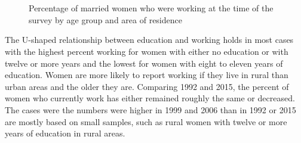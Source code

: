 \documentclass[12pt,letterpaper]{article}
\begin{document}
\begin{figure}[!htpb]
\centering
{}
\\
\\
\caption{Percentage of married women who were working at the time of the 
survey by age group and area of residence}
\label{fig:work_by_survey}
\end{figure}


The U-shaped relationship between education and working holds in most cases with 
the highest percent working for women with either no education or with twelve or 
more years and the lowest for women with eight to eleven years of education.
Women are more likely to report working if they live in rural than urban areas 
and the older they are.
Comparing 1992 and 2015, the percent of women who currently work has either 
remained roughly the same or decreased.
The cases were the numbers were higher in 1999 and 2006 than in 1992 or 2015 
are mostly based on small samples, such as rural women with twelve or more 
years of education in rural areas.
\end{document}
